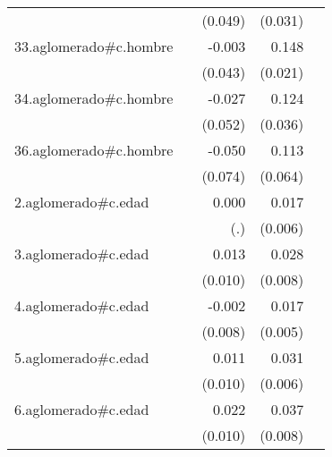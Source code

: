 {\begin{longtable}{l*{4}{D{.}{.}{-1}}}
            &                     &     (0.049)         &     (0.031)         &                     \\
\addlinespace
33.aglomerado#c.hombre&                     &      -0.003         &       0.148\sym{***}&                     \\
            &                     &     (0.043)         &     (0.021)         &                     \\
\addlinespace
34.aglomerado#c.hombre&                     &      -0.027         &       0.124\sym{***}&                     \\
            &                     &     (0.052)         &     (0.036)         &                     \\
\addlinespace
36.aglomerado#c.hombre&                     &      -0.050         &       0.113         &                     \\
            &                     &     (0.074)         &     (0.064)         &                     \\
\addlinespace
2.aglomerado#c.edad&                     &       0.000         &       0.017\sym{**} &                     \\
            &                     &         (.)         &     (0.006)         &                     \\
\addlinespace
3.aglomerado#c.edad&                     &       0.013         &       0.028\sym{***}&                     \\
            &                     &     (0.010)         &     (0.008)         &                     \\
\addlinespace
4.aglomerado#c.edad&                     &      -0.002         &       0.017\sym{**} &                     \\
            &                     &     (0.008)         &     (0.005)         &                     \\
\addlinespace
5.aglomerado#c.edad&                     &       0.011         &       0.031\sym{***}&                     \\
            &                     &     (0.010)         &     (0.006)         &                     \\
\addlinespace
6.aglomerado#c.edad&                     &       0.022\sym{*}  &       0.037\sym{***}&                     \\
            &                     &     (0.010)         &     (0.008)         &                     \\

\end{longtable}}
